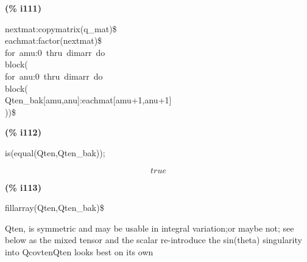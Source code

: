 \documentclass[fleqn]{article}
\begin{document}
\noindent%



\noindent
\begin{minipage}[t]{4.000000em}\color{red}\bfseries
(\% i111)	
\end{minipage}
\begin{minipage}[t]{\textwidth}\color{blue}
nextmat:copymatrix(q\_mat)\$\\
eachmat:factor(nextmat)\$\\
for\ amu:0\ thru\ dimarr\ do\\
block(\\
for\ anu:0\ thru\ dimarr\ do\\
block(\\
Qten\_bak[amu,anu]:eachmat[amu+1,anu+1]\\
))\$
\end{minipage}

\noindent%



\noindent
\begin{minipage}[t]{4.000000em}\color{red}\bfseries
(\% i112)	
\end{minipage}
\begin{minipage}[t]{\textwidth}\color{blue}
is(equal(Qten,Qten\_bak));
\end{minipage}
\[\displaystyle \tag{\% o112} 
true\mbox{}
\]


\noindent
\begin{minipage}[t]{4.000000em}\color{red}\bfseries
(\% i113)	
\end{minipage}
\begin{minipage}[t]{\textwidth}\color{blue}
fillarray(Qten,Qten\_bak)\$
\end{minipage}

\noindent%

Qten, is symmetric and may be usable in integral variation;or maybe not; see below as the mixed tensor and the scalar re-introduce the sin(theta) singularity into QcovtenQten looks best on its own
\end{document}
